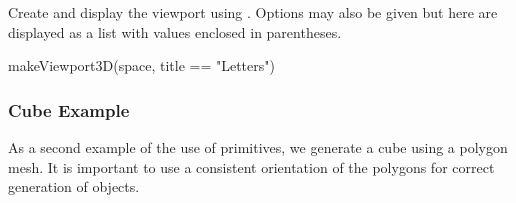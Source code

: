 \begin{psXtc}
\begin{xtccomment}
Create and display the viewport using .
Options may also be given but here are displayed as a list with values
enclosed in parentheses.
\end{xtccomment}
\begin{spadsrc}
makeViewport3D(space, title == "Letters") 
\end{spadsrc}
\end{psXtc}

\subsubsection{Cube Example}

As a second example of the use of primitives, we generate a cube using a
polygon mesh.
It is important to use a consistent orientation of the polygons for
correct generation of \threedim{} objects.

